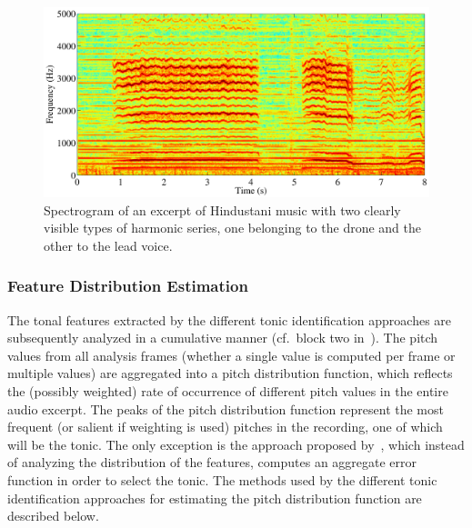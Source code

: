 \begin{figure}
	\begin{center}
		\includegraphics[width=\figSizeNinety]{ch02_background/figures/2HarmonicSeries.pdf}
	\end{center}
	\caption[Spectrogram of an excerpt of Hindustani music illustrating presence of the lead voice and the drone]{Spectrogram of an excerpt of Hindustani music with two clearly visible types of harmonic series, one belonging to the drone and the other to the lead voice.}
	\label{fig:2HarmonicSeries}
\end{figure}


\subsubsection{Feature Distribution Estimation}
\label{sec:background_tonic_feature_distribution_estimation}

The tonal features extracted by the different tonic identification approaches are subsequently analyzed in a cumulative manner (cf.~block two in~). The pitch values from all analysis frames (whether a single value is computed per frame or multiple values) are aggregated into a pitch distribution function, which reflects the (possibly weighted) rate of occurrence of different pitch values in the entire audio excerpt. The peaks of the pitch distribution function represent the most frequent (or salient if weighting is used) pitches in the recording, one of which will be the tonic. The only exception is the approach proposed by~\cite{Sengupta2005b}, which instead of analyzing the distribution of the features, computes an aggregate error function in order to select the tonic. The methods used by the different tonic identification approaches for estimating the pitch distribution function are described below.

